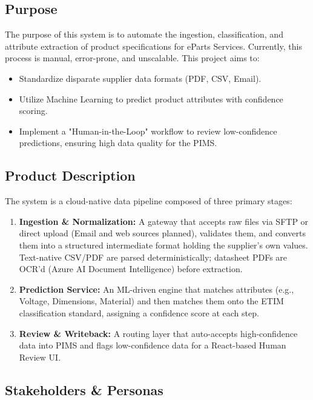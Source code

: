 \documentclass[12pt, a4paper]{article}
\begin{document}
\subsection{Purpose}
The purpose of this system is to automate the ingestion, classification, and attribute extraction of product specifications for eParts Services. Currently, this process is manual, error-prone, and unscalable. This project aims to:
\begin{itemize}
    \item Standardize disparate supplier data formats (PDF, CSV, Email).
    \item Utilize Machine Learning to predict product attributes with confidence scoring.
    \item Implement a "Human-in-the-Loop" workflow to review low-confidence predictions, ensuring high data quality for the PIMS.
\end{itemize}

\subsection{Product Description}
The system is a cloud-native data pipeline composed of three primary stages:
\begin{enumerate}
    \item \textbf{Ingestion \& Normalization:} A gateway that accepts raw files via SFTP or direct upload (Email and web sources planned), validates them, and converts them into a structured intermediate format holding the supplier's own values. Text-native CSV/PDF are parsed deterministically; datasheet PDFs are OCR'd (Azure AI Document Intelligence) before extraction.
    \item \textbf{Prediction Service:} An ML-driven engine that matches attributes (e.g., Voltage, Dimensions, Material) and then matches them onto the ETIM classification standard, assigning a confidence score at each step.
    \item \textbf{Review \& Writeback:} A routing layer that auto-accepts high-confidence data into PIMS and flags low-confidence data for a React-based Human Review UI.
\end{enumerate}

\subsection{Stakeholders \& Personas}
\end{document}
